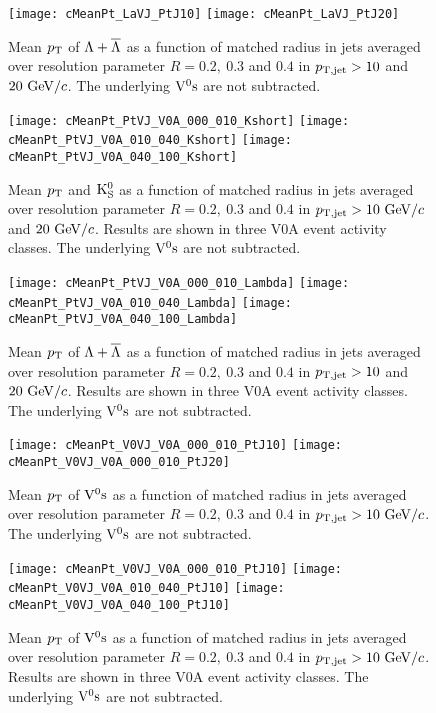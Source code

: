 \documentclass[12pt]{article}
\begin{document}
\begin{figure}[htbp]
\centering
\texttt{[image: cMeanPt\_LaVJ\_PtJ10]}
\texttt{[image: cMeanPt\_LaVJ\_PtJ20]}
\caption{Mean $p_{\rm T}$ of $\Lambda+\overline{\Lambda}$ as a function of matched radius
in jets averaged over resolution parameter $R=0.2,~0.3$
and $0.4$ in $p_{\rm T,jet}>10$ and $20~{\rm GeV}/c$.
The underlying ${\rm V}^{0}{\rm s}$ are not subtracted.}
\label{fig:s03MeanLaVJ}
\end{figure}

\begin{figure}[htbp]
\centering
\texttt{[image: cMeanPt\_PtVJ\_V0A\_000\_010\_Kshort]}
\texttt{[image: cMeanPt\_PtVJ\_V0A\_010\_040\_Kshort]}
\texttt{[image: cMeanPt\_PtVJ\_V0A\_040\_100\_Kshort]}
\caption{Mean $p_{\rm T}$ and ${\rm K}_{\rm S}^{0}$ as a function of matched radius
in jets averaged over resolution parameter $R=0.2,~0.3$
and $0.4$ in $p_{\rm T,jet}>10~{\rm GeV}/c$ and $20~{\rm GeV}/c$.
Results are shown in three V0A event activity classes.
The underlying ${\rm V}^{0}{\rm s}$ are not subtracted.}
\label{fig:s03MeanActLaVJ}
\end{figure}

\begin{figure}[htbp]
\centering
\texttt{[image: cMeanPt\_PtVJ\_V0A\_000\_010\_Lambda]}
\texttt{[image: cMeanPt\_PtVJ\_V0A\_010\_040\_Lambda]}
\texttt{[image: cMeanPt\_PtVJ\_V0A\_040\_100\_Lambda]}
\caption{Mean $p_{\rm T}$ of $\Lambda+\overline{\Lambda}$ as a function of matched radius
in jets averaged over resolution parameter $R=0.2,~0.3$
and $0.4$ in $p_{\rm T,jet}>10$ and $20~{\rm GeV}/c$.
Results are shown in three V0A event activity classes.
The underlying ${\rm V}^{0}{\rm s}$ are not subtracted.}
\label{fig:s03MeanActLaVJ}
\end{figure}

\begin{figure}[htbp]
\centering
\texttt{[image: cMeanPt\_V0VJ\_V0A\_000\_010\_PtJ10]}
\texttt{[image: cMeanPt\_V0VJ\_V0A\_000\_010\_PtJ20]}
\caption{Mean $p_{\rm T}$ of ${\rm V}^{0}{\rm s}$ as a function of matched radius
in jets averaged over resolution parameter $R=0.2,~0.3$
and $0.4$ in $p_{\rm T,jet}>10~{\rm GeV}/c$.
The underlying ${\rm V}^{0}{\rm s}$ are not subtracted.}
\label{fig:s03MeanV0VJ}
\end{figure}

\begin{figure}[htbp]
\centering
\texttt{[image: cMeanPt\_V0VJ\_V0A\_000\_010\_PtJ10]}
\texttt{[image: cMeanPt\_V0VJ\_V0A\_010\_040\_PtJ10]}
\texttt{[image: cMeanPt\_V0VJ\_V0A\_040\_100\_PtJ10]}
\caption{Mean $p_{\rm T}$ of ${\rm V}^{0}{\rm s}$ as a function of matched radius
in jets averaged over resolution parameter $R=0.2,~0.3$
and $0.4$ in $p_{\rm T,jet}>10~{\rm GeV}/c$.
Results are shown in three V0A event activity classes.
The underlying ${\rm V}^{0}{\rm s}$ are not subtracted.}
\label{fig:s03MeanActV0VJ}
\end{figure}
\end{document}
